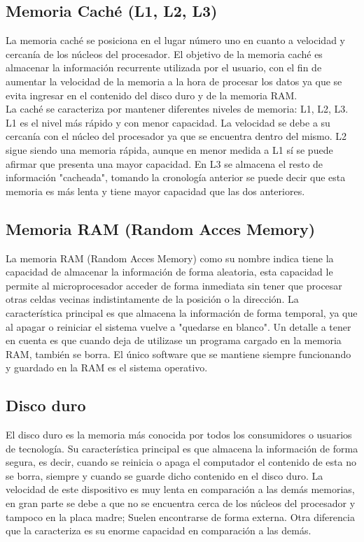 \documentclass{article}
\begin{document}
\subsection{Memoria Caché (L1, L2, L3)}
\noindent
La memoria caché se posiciona en el lugar número uno en cuanto a velocidad y cercanía de los núcleos del procesador. El objetivo de la memoria caché es almacenar la información recurrente utilizada por el usuario, con el fin de aumentar la velocidad de la memoria a la hora de procesar los datos ya que se evita ingresar en el contenido del disco duro y de la memoria RAM.\\
\noindent
La caché se caracteriza por mantener diferentes niveles de memoria: L1, L2, L3.
L1 es el nivel más rápido y con menor capacidad. La velocidad se debe a su cercanía con el núcleo del procesador ya que se encuentra dentro del mismo.
L2 sigue siendo una memoria rápida, aunque en menor medida a L1 sí se puede afirmar que presenta una mayor capacidad.
En L3 se almacena el resto de información "cacheada", tomando la cronología anterior se puede decir que esta memoria es más lenta y tiene mayor capacidad que las dos anteriores.

\subsection{Memoria RAM (Random Acces Memory)}
\noindent
La memoria RAM (Random Acces Memory) como su nombre indica tiene la capacidad de almacenar la información de forma aleatoria, esta capacidad le permite al microprocesador acceder de forma inmediata sin tener que procesar otras celdas vecinas indistintamente de la posición o la dirección. 
La característica principal es que almacena la información de forma temporal, ya que al apagar o reiniciar el sistema vuelve a "quedarse en blanco".
Un detalle a tener en cuenta es que cuando deja de utilizase un programa cargado en la memoria RAM, también se borra. El único software que se mantiene siempre funcionando y guardado en la RAM es el sistema operativo.\cite{online}



\subsection{Disco duro}
\noindent
El disco duro es la memoria más conocida por todos los consumidores o usuarios de tecnología. Su característica principal es que almacena la información de forma segura, es decir, cuando se reinicia o apaga el computador el contenido de esta no se borra, siempre y cuando se guarde dicho contenido en el disco duro.
La velocidad de este dispositivo es muy lenta en comparación a las demás memorias, en gran parte se debe a que no se encuentra cerca de los núcleos del procesador y tampoco en la placa madre; Suelen encontrarse de forma externa. Otra diferencia que la caracteriza es su enorme capacidad en comparación a las demás.
\end{document}
